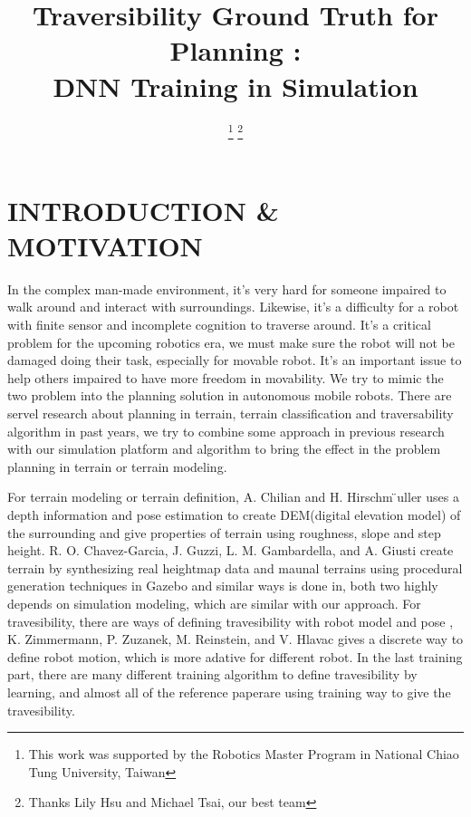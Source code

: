 \documentclass[letterpaper, 10 pt, conference]{ieeeconf}  %
\title{\LARGE \bf
Traversibility Ground Truth for Planning :\protect\\
DNN Training in Simulation
}
\author{ %
\thanks{This work was supported by the Robotics Master Program in National Chiao Tung University, Taiwan}%
\thanks{Thanks Lily Hsu and Michael Tsai, our best team}%
}
\begin{document}
\maketitle
\thispagestyle{empty}
\pagestyle{empty}


\section{INTRODUCTION \& MOTIVATION}
In the complex man-made environment, it's very hard for someone impaired to walk around and interact with surroundings. Likewise, it's a difficulty for a robot with  finite sensor and  incomplete cognition to traverse around. It's a critical problem for the upcoming robotics era, we must make sure the robot will not be damaged doing their task, especially for movable robot. It's an important issue to help others impaired to have more freedom in movability. We try to mimic the two problem  into the planning solution in autonomous mobile robots. There are servel research about planning in terrain, terrain classification and traversability algorithm in past years, we try to combine some approach in previous research with our simulation platform and algorithm to bring the effect in 
the problem planning in terrain or terrain modeling. 


For terrain modeling or terrain definition, A. Chilian and H. Hirschm ̈uller \cite{chilian2009stereo} uses a depth information and pose estimation to create DEM(digital elevation model) of the surrounding and give properties of terrain using roughness, slope and step height. R. O. Chavez-Garcia, J. Guzzi, L. M. Gambardella, and A. Giusti\cite{chavez2017learning} create terrain by synthesizing real heightmap data and maunal terrains using procedural generation techniques in Gazebo and similar ways is done in\cite{hewitt2017training}, both two highly depends on simulation modeling, which are similar with our approach.  For travesibility, there are ways of defining travesibility with robot model and pose \cite{zimmermann2014adaptive} \cite{dupont2008terrain}, K. Zimmermann, P. Zuzanek, M. Reinstein, and V. Hlavac \cite{zimmermann2014adaptive} gives a discrete way to define robot motion, which is more adative for different robot. In the last training part, there are many different training algorithm 
to define travesibility by learning, and almost all of the reference paper\cite{chavez2017learning}\cite{hewitt2017training}\cite{zimmermann2014adaptive}\cite{dupont2008terrain}\cite{kim2007traversability}\cite{kim2006traversability}are using training way to give the travesibility.
\end{document}
